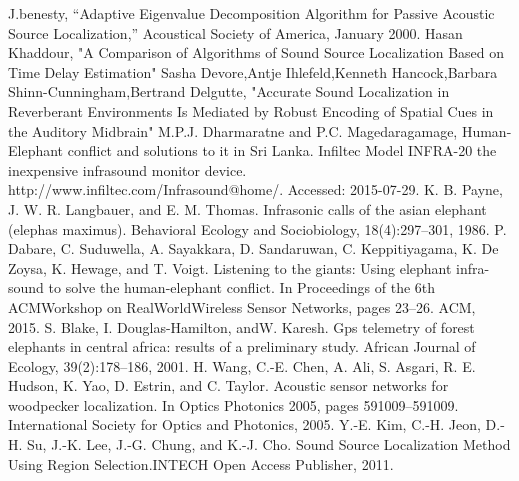 \documentclass[12pt]{article}
\numberwithin{figure}{section}
\numberwithin{table}{section}
\begin{document}
\begin{thebibliography}{1}
  J.benesty, “Adaptive Eigenvalue Decomposition Algorithm for Passive Acoustic Source Localization,” Acoustical Society of America, January 2000.
 Hasan Khaddour, "A Comparison of Algorithms of Sound Source Localization Based
on Time Delay Estimation"
 Sasha Devore,Antje Ihlefeld,Kenneth Hancock,Barbara Shinn-Cunningham,Bertrand Delgutte,
"Accurate Sound Localization in Reverberant Environments Is Mediated by Robust Encoding of Spatial Cues in the Auditory Midbrain"
M.P.J. Dharmaratne and P.C. Magedaragamage, Human-Elephant conflict and solutions to it in Sri Lanka.
 Infiltec Model INFRA-20 the inexpensive infrasound monitor device. http://www.infiltec.com/Infrasound@home/. Accessed: 2015-07-29.
 K. B. Payne, J. W. R. Langbauer, and E. M. Thomas. Infrasonic calls of the asian elephant (elephas maximus). Behavioral Ecology and Sociobiology, 18(4):297–301, 1986.
P. Dabare, C. Suduwella, A. Sayakkara, D. Sandaruwan, C. Keppitiyagama, K. De Zoysa, K. Hewage, and T. Voigt. Listening to the giants: Using elephant infra-sound to solve the human-elephant conflict. In Proceedings of the 6th ACMWorkshop on RealWorldWireless Sensor Networks, pages 23–26. ACM, 2015.
 S. Blake, I. Douglas-Hamilton, andW. Karesh. Gps telemetry of forest elephants in central africa: results of a preliminary study. African Journal of Ecology, 39(2):178–186, 2001.
H. Wang, C.-E. Chen, A. Ali, S. Asgari, R. E. Hudson, K. Yao, D. Estrin, and C. Taylor. Acoustic sensor networks for woodpecker localization. In Optics Photonics 2005, pages 591009–591009. International Society for Optics and Photonics, 2005.
Y.-E. Kim, C.-H. Jeon, D.-H. Su, J.-K. Lee, J.-G. Chung, and K.-J. Cho. Sound Source Localization Method Using Region Selection.INTECH Open Access Publisher, 2011.

\end{thebibliography}
\end{document}
